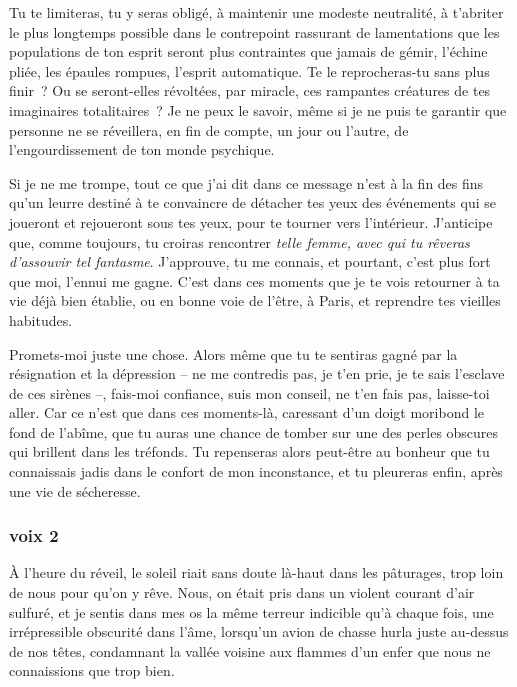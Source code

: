 \documentclass[
  extrafontsizes,
  oneside,
  14pt
]{memoir}
\begin{document}
Tu te limiteras, tu y seras obligé, à maintenir une modeste neutralité, à
t'abriter le plus longtemps possible dans le contrepoint rassurant de
lamentations que les populations de ton esprit seront plus contraintes que
jamais de gémir, l'échine pliée, les épaules rompues, l'esprit automatique. Te
le reprocheras-tu sans plus finir~? Ou se seront-elles révoltées, par miracle,
ces rampantes créatures de tes imaginaires totalitaires~? Je ne peux le savoir,
même si je ne puis te garantir que personne ne se réveillera, en fin de compte,
un jour ou l'autre, de l'engourdissement de ton monde psychique.

Si je ne me trompe, tout ce que j'ai dit dans ce message n'est à la fin des
fins qu'un leurre destiné à te convaincre de détacher tes yeux des événements
qui se joueront et rejoueront sous tes yeux, pour te tourner vers l'intérieur.
J'anticipe que, comme toujours, tu croiras rencontrer \emph{telle femme, avec
qui tu rêveras d'assouvir tel fantasme}. J'approuve, tu me connais, et
pourtant, c'est plus fort que moi, l'ennui me gagne. C'est dans ces moments que
je te vois retourner à ta vie déjà bien établie, ou en bonne voie de l'être, à
Paris, et reprendre tes vieilles habitudes.

Promets-moi juste une chose. Alors même que tu te sentiras gagné par la
résignation et la dépression -- ne me contredis pas, je t'en prie, je te sais
l'esclave de ces sirènes --, fais-moi confiance, suis mon conseil, ne t'en fais
pas, laisse-toi aller. Car ce n'est que dans ces moments-là, caressant d'un
doigt moribond le fond de l'abîme, que tu auras une chance de tomber sur une
des perles obscures qui brillent dans les tréfonds. Tu repenseras alors
peut-être au bonheur que tu connaissais jadis dans le confort de mon
inconstance, et tu pleureras enfin, après une vie de sécheresse.

\newpage

\subsubsection{voix 2}\label{voix-2}

À l'heure du réveil, le soleil riait sans doute là-haut dans les pâturages,
trop loin de nous pour qu'on y rêve. Nous, on était pris dans un violent
courant d'air sulfuré, et je sentis dans mes os la même terreur indicible qu'à
chaque fois, une irrépressible obscurité dans l'âme, lorsqu'un avion de chasse
hurla juste au-dessus de nos têtes, condamnant la vallée voisine aux flammes
d'un enfer que nous ne connaissions que trop bien.
\end{document}
